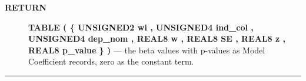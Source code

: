 \par
\begin{description}
\item [\colorbox{tagtype}{\color{white} \textbf{\textsf{RETURN}}}] \textbf{TABLE ( \{ UNSIGNED2 wi , UNSIGNED4 ind\_col , UNSIGNED4 dep\_nom , REAL8 w , REAL8 SE , REAL8 z , REAL8 p\_value \} )} --- the beta values with p-values as Model Coefficient records, zero as the constant term.
\end{description}




\rule{\linewidth}{0.5pt}
